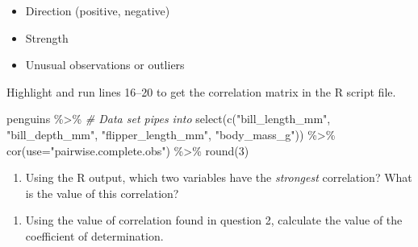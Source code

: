 \documentclass[
]{report}
\newenvironment{Shaded}{\begin{snugshade}}{\end{snugshade}}
\newcommand{\AttributeTok}[1]{\textcolor[rgb]{0.77,0.63,0.00}{#1}}
\newcommand{\CommentTok}[1]{\textcolor[rgb]{0.56,0.35,0.01}{\textit{#1}}}
\newcommand{\DecValTok}[1]{\textcolor[rgb]{0.00,0.00,0.81}{#1}}
\newcommand{\FunctionTok}[1]{\textcolor[rgb]{0.00,0.00,0.00}{#1}}
\newcommand{\NormalTok}[1]{#1}
\newcommand{\SpecialCharTok}[1]{\textcolor[rgb]{0.00,0.00,0.00}{#1}}
\newcommand{\StringTok}[1]{\textcolor[rgb]{0.31,0.60,0.02}{#1}}
\providecommand{\tightlist}{%
  \setlength{\itemsep}{0pt}\setlength{\parskip}{0pt}}
\begin{document}
\begin{itemize}
\tightlist
\item
  Direction (positive, negative)
\end{itemize}

\vspace{.1in}

\begin{itemize}
\tightlist
\item
  Strength
\end{itemize}

\vspace{.1in}

\begin{itemize}
\tightlist
\item
  Unusual observations or outliers
\end{itemize}

\vspace{.1in}

Highlight and run lines 16--20 to get the correlation matrix in the R script file.

\begin{Shaded}
\begin{Highlighting}[]
\NormalTok{penguins }\SpecialCharTok{\%\textgreater{}\%}  \CommentTok{\# Data set pipes into}
  \FunctionTok{select}\NormalTok{(}\FunctionTok{c}\NormalTok{(}\StringTok{"bill\_length\_mm"}\NormalTok{, }\StringTok{"bill\_depth\_mm"}\NormalTok{, }
           \StringTok{"flipper\_length\_mm"}\NormalTok{, }\StringTok{"body\_mass\_g"}\NormalTok{)) }\SpecialCharTok{\%\textgreater{}\%}
  \FunctionTok{cor}\NormalTok{(}\AttributeTok{use=}\StringTok{"pairwise.complete.obs"}\NormalTok{) }\SpecialCharTok{\%\textgreater{}\%}
  \FunctionTok{round}\NormalTok{(}\DecValTok{3}\NormalTok{)}
\end{Highlighting}
\end{Shaded}

\begin{enumerate}
\def\labelenumi{\arabic{enumi}.}
\setcounter{enumi}{1}
\tightlist
\item
  Using the R output, which two variables have the \emph{strongest} correlation? What is the value of this correlation?
\end{enumerate}

\vspace{0.5in}

\begin{enumerate}
\def\labelenumi{\arabic{enumi}.}
\setcounter{enumi}{2}
\tightlist
\item
  Using the value of correlation found in question 2, calculate the value of the coefficient of determination.
\end{enumerate}
\end{document}
